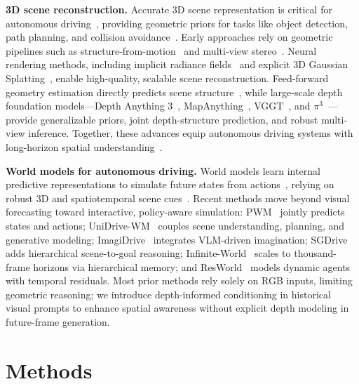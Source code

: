 \documentclass[runningheads]{llncs}
\begin{document}
\noindent\textbf{3D scene reconstruction.}
Accurate 3D scene representation is critical for autonomous driving~\cite{deng2026best3dscenerepresentation,chib2024e2eadsurvey}, providing geometric priors for tasks like object detection, path planning, and collision avoidance~\cite{zheng2024gaussianad,chen2025geodrive}. Early approaches rely on geometric pipelines such as structure-from-motion~\cite{Schonberger2016sfmrevisited, pan2025globalsfmrevisited} and multi-view stereo~\cite{Seitz2006mvs,pepe2022uavplatformsandthesfm-mvsapproach}. Neural rendering methods, including implicit radiance fields~\cite{mildenhall2021nerf,xiao2025neuralradiancefieldsreal} and explicit 3D Gaussian Splatting~\cite{kerbl20233dgaussian,huang2024textits3gaussian}, enable high-quality, scalable scene reconstruction. Feed-forward geometry estimation directly predicts scene structure~\cite{chirstodoulides2025surveyon3drecon}, while large-scale depth foundation models—Depth Anything 3~\cite{lin2025depth3recoveringvisual}, MapAnything~\cite{keetha2026mapanything}, VGGT~\cite{Wang2025vggt}, and $\pi^3$~\cite{wang2025pi3}—provide generalizable priors, joint depth-structure prediction, and robust multi-view inference. Together, these advances equip autonomous driving systems with long-horizon spatial understanding~\cite{li2025comprehensivesurveyworldmodels}.

\noindent\textbf{World models for autonomous driving.}
World models learn internal predictive representations to simulate future states from actions~\cite{li2025comprehensivesurveyworldmodels}, relying on robust 3D and spatiotemporal scene cues~\cite{chen2025geodrive,gao2025rad,yuan2024presight}. Recent methods move beyond visual forecasting toward interactive, policy-aware simulation: PWM~\cite{zhao2025pwm} jointly predicts states and actions; UniDrive-WM~\cite{xiong2026unidrivewm} couples scene understanding, planning, and generative modeling; ImagiDrive~\cite{li2025imagidrive} integrates VLM-driven imagination; SGDrive~\cite{li2026sgdrive} adds hierarchical scene-to-goal reasoning; Infinite-World~\cite{wu2026infiniteworld} scales to thousand-frame horizons via hierarchical memory; and ResWorld~\cite{zhang2026resworld} models dynamic agents with temporal residuals. Most prior methods rely solely on RGB inputs, limiting geometric reasoning; we introduce depth-informed conditioning in historical visual prompts to enhance spatial awareness without explicit depth modeling in future-frame generation.

\section{Methods}
\label{sec:methods}
\end{document}
